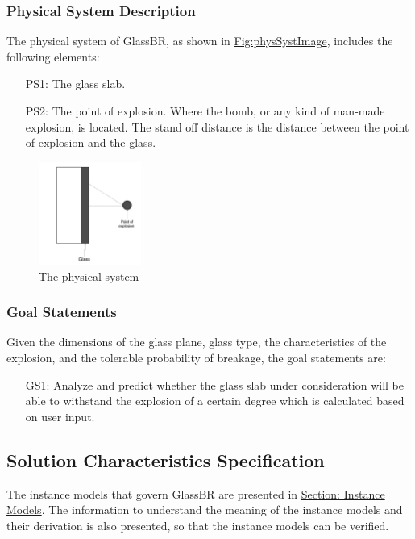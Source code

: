 \documentclass[12pt]{article}
\begin{document}
\subsubsection{Physical System Description}
\label{Sec:PhysSyst}
The physical system of GlassBR, as shown in \hyperref[Figure:physSystImage]{Fig:physSystImage}, includes the following elements:
\begin{itemize}
\item[PS1:]The glass slab.
\item[PS2:]The point of explosion. Where the bomb, or any kind of man-made explosion, is located. The stand off distance is the distance between the point of explosion and the glass.
\end{itemize}
\begin{figure}
\begin{center}
\includegraphics[width=0.3\textwidth]{../../../datafiles/GlassBR/physicalsystimage.png}
\caption{The physical system}
\label{Figure:physSystImage}
\end{center}
\end{figure}
\subsubsection{Goal Statements}
\label{Sec:GoalStmt}
Given the dimensions of the glass plane, glass type, the characteristics of the explosion, and the tolerable probability of breakage, the goal statements are:
\begin{itemize}
\item[GS1:]Analyze and predict whether the glass slab under consideration will be able to withstand the explosion of a certain degree which is calculated based on user input.
\end{itemize}
\subsection{Solution Characteristics Specification}
\label{Sec:SolCharSpec}
The instance models that govern GlassBR are presented in \hyperref[Sec:IMs]{Section: Instance Models}. The information to understand the meaning of the instance models and their derivation is also presented, so that the instance models can be verified.
\end{document}
